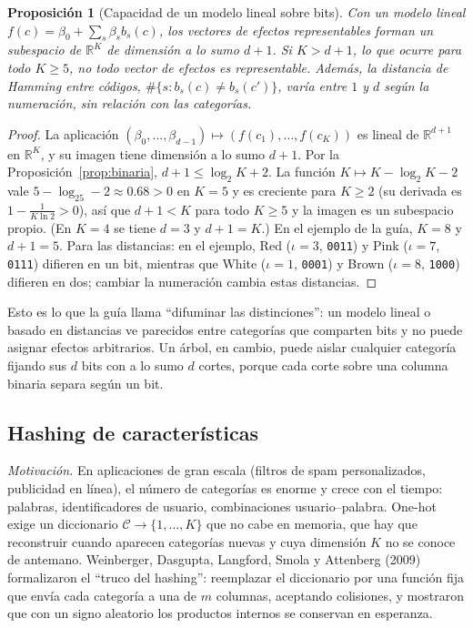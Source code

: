 \documentclass[11pt]{article}
\newtheorem{proposicion}[teorema]{Proposición}
\theoremstyle{definition}
\theoremstyle{remark}
\newcommand{\R}{\mathbb{R}}
\begin{document}
\begin{proposicion}[Capacidad de un modelo lineal sobre bits]\label{prop:binaria-lineal}
\noindent Con un modelo lineal $f(c)=\beta_0+\sum_{s}\beta_sb_s(c)$, los vectores de efectos representables forman un subespacio de $\R^K$ de dimensión a lo sumo $d+1$. Si $K>d+1$, lo que ocurre para todo $K\ge5$, no todo vector de efectos es representable. Además, la distancia de Hamming entre códigos, $\#\{s:b_s(c)\ne b_s(c')\}$, varía entre $1$ y $d$ según la numeración, sin relación con las categorías.
\end{proposicion}
\begin{proof}
\noindent La aplicación $(\beta_0,\dots,\beta_{d-1})\mapsto(f(c_1),\dots,f(c_K))$ es lineal de $\R^{d+1}$ en $\R^K$, y su imagen tiene dimensión a lo sumo $d+1$. Por la Proposición~\ref{prop:binaria}, $d+1\le\log_2K+2$. La función $K\mapsto K-\log_2K-2$ vale $5-\log_25-2\approx0.68>0$ en $K=5$ y es creciente para $K\ge2$ (su derivada es $1-\frac1{K\ln2}>0$), así que $d+1<K$ para todo $K\ge5$ y la imagen es un subespacio propio. (En $K=4$ se tiene $d=3$ y $d+1=K$.) En el ejemplo de la guía, $K=8$ y $d+1=5$. Para las distancias: en el ejemplo, Red ($\iota=3$, \texttt{0011}) y Pink ($\iota=7$, \texttt{0111}) difieren en un bit, mientras que White ($\iota=1$, \texttt{0001}) y Brown ($\iota=8$, \texttt{1000}) difieren en dos; cambiar la numeración cambia estas distancias.
\end{proof}

\noindent Esto es lo que la guía llama ``difuminar las distinciones'': un modelo lineal o basado en distancias ve parecidos entre categorías que comparten bits y no puede asignar efectos arbitrarios. Un árbol, en cambio, puede aislar cualquier categoría fijando sus $d$ bits con a lo sumo $d$ cortes, porque cada corte sobre una columna binaria separa según un bit.

\subsection{Hashing de características}\label{sec:hashing}

\noindent \emph{Motivación.} En aplicaciones de gran escala (filtros de spam personalizados, publicidad en línea), el número de categorías es enorme y crece con el tiempo: palabras, identificadores de usuario, combinaciones usuario--palabra. One-hot exige un diccionario $\mathcal{C}\to\{1,\dots,K\}$ que no cabe en memoria, que hay que reconstruir cuando aparecen categorías nuevas y cuya dimensión $K$ no se conoce de antemano. Weinberger, Dasgupta, Langford, Smola y Attenberg (2009) formalizaron el ``truco del hashing'': reemplazar el diccionario por una función fija que envía cada categoría a una de $m$ columnas, aceptando colisiones, y mostraron que con un signo aleatorio los productos internos se conservan en esperanza.
\end{document}
